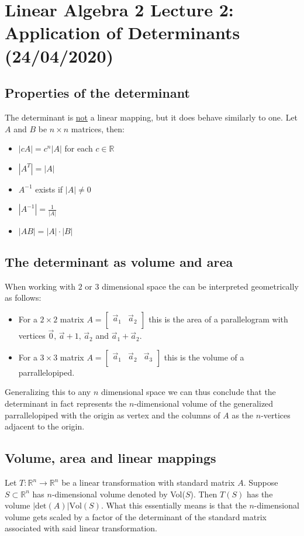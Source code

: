 \documentclass[11pt, a4paper]{article}
\newcommand*{\R}{\ensuremath{\mathbb{R}}}
\begin{document}
\setcounter{section}{1}
\setcounter{equation}{0}

\section{Linear Algebra 2 Lecture 2: Application of Determinants (24/04/2020)}


\subsection{Properties of the determinant}
The determinant is \underline{not} a linear mapping, but it does behave similarly to one. Let $A$ and $B$ be $n \times n$ matrices, then:
\begin{itemize}
  \item $|cA| = c^n|A|$ for each $c \in \R$
  \item $|A^T| = |A|$
  \item $A^{-1}$ exists if $|A| \neq 0$
  \item $|A^{-1}|=\frac{1}{|A|}$ 
  \item $|AB| = |A| \cdot |B|$
\end{itemize}


\subsection{The determinant as volume and area}
When working with $2$ or $3$ dimensional space the can be interpreted geometrically as follows:
\begin{itemize}
  \item For a $2 \times 2$ matrix $A = \begin{bmatrix} \vec{a}_1 & \vec{a}_2\\ \end{bmatrix}$ this is the area of a parallelogram with vertices $\vec{0},\, \vec{a}+1,\, \vec{a}_2$ and $\vec{a}_1 + \vec{a}_2$.
  \item For a $3 \times 3$ matrix $A = \begin{bmatrix} \vec{a}_1 & \vec{a}_2 & \vec{a}_3\\ \end{bmatrix}$ this is the volume of a parrallelopiped.
\end{itemize}
Generalizing this to any $n$ dimensional space we can thus conclude that the determinant in fact represents the $n$-dimensional volume of the generalized parrallelopiped with the origin as vertex and the columns of $A$ as the $n$-vertices adjacent to the origin.


\subsection{Volume, area and linear mappings}
Let $T: \R^n \to \R^n$ be a linear transformation with standard matrix $A$. Suppose $S \subset \R^n$ has $n$-dimensional volume denoted by Vol($S$). Then $T(S)$ has the volume $|\text{det}(A)|\text{Vol}(S)$. What this essentially means is that the $n$-dimensional volume gets scaled by a factor of the determinant of the standard matrix associated with said linear transformation.
\end{document}
